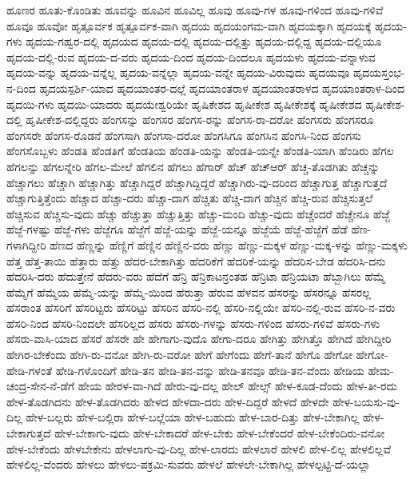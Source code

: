 {ಹೂಣರ
ಹೂತು-ಕೊಂಡಿತು
ಹೂವನ್ನು
ಹೂವಿನ
ಹೂವಿಲ್ಲ
ಹೂವು
ಹೂವು-ಗಳ
ಹೂವು-ಗಳಿಂದ
ಹೂವು-ಗಳಿವೆ
ಹೂವೂ
ಹೂವೋ
ಹೃತ್ಪೂರ್ವಕ
ಹೃತ್ಪೂರ್ವಕ-ವಾಗಿ
ಹೃದಯ
ಹೃದಯಂಗಮ-ವಾಗಿ
ಹೃದಯಕ್ಕಾಗಿ
ಹೃದಯಕ್ಕೆ
ಹೃದಯ-ಗಳು
ಹೃದಯ-ಗಹ್ವರ-ದಲ್ಲಿ
ಹೃದಯದ
ಹೃದಯ-ದಲ್ಲಿ
ಹೃದಯ-ದಲ್ಲಿತ್ತು
ಹೃದಯ-ದಲ್ಲಿದ್ದ
ಹೃದಯ-ದಲ್ಲಿಯೂ
ಹೃದಯ-ದಲ್ಲಿ-ರುವ
ಹೃದಯ-ದ-ವರು
ಹೃದಯ-ದಿಂದ
ಹೃದಯ-ದಿಂದಲೂ
ಹೃದಯಳು
ಹೃದಯ-ವನ್ನಾಳುವ
ಹೃದಯ-ವನ್ನು
ಹೃದಯ-ವನ್ನೆಲ್ಲ
ಹೃದಯ-ವನ್ನೆಲ್ಲಾ
ಹೃದಯ-ವನ್ನೇ
ಹೃದಯ-ವಿರುವುದು
ಹೃದಯವೂ
ಹೃದಯಸ್ತಂಭ-ನ-ದಿಂದ
ಹೃದಯಸ್ಪರ್ಶಿ-ಯಾದ
ಹೃದಯಾಂತರ-ದಲ್ಲೆ
ಹೃದಯಾಂತರಾಳ
ಹೃದಯಾಂತರಾಳದ
ಹೃದಯಾಂತರಾಳ-ದಿಂದ
ಹೃದಯಿ-ಗಳು
ಹೃದಯಿ-ಯಾದರು
ಹೃದಯೇಶ್ವರಿಯೇ
ಹೃಷಿಕೇಶದ
ಹೃಷೀಕೇಶ
ಹೃಷೀಕೇಶಕ್ಕೆ
ಹೃಷೀಕೇಶದ
ಹೃಷೀಕೇಶ-ದಲ್ಲಿ
ಹೃಷೀಕೇಶ-ದಲ್ಲಿದ್ದರು
ಹೆಂಗಸನ್ನು
ಹೆಂಗಸರ
ಹೆಂಗಸ-ರನ್ನು
ಹೆಂಗಸ-ರಾ-ದರೋ
ಹೆಂಗಸರು
ಹೆಂಗಸರೂ
ಹೆಂಗಸರೇ
ಹೆಂಗಸ-ರೊಡನೆ
ಹೆಂಗಸಾಗಿ
ಹೆಂಗಸಾ-ದರೋ
ಹೆಂಗಸಿಗೂ
ಹೆಂಗಸಿನ
ಹೆಂಗಸಿ-ನಿಂದ
ಹೆಂಗಸು
ಹೆಂಗಸೊಬ್ಬಳು
ಹೆಂಡತಿ
ಹೆಂಡತಿಗೆ
ಹೆಂಡತಿಯ
ಹೆಂಡತಿ-ಯನ್ನು
ಹೆಂಡತಿ-ಯನ್ನೇ
ಹೆಂಡತಿ-ಯಾಗಿ
ಹೆಂಡಿರು
ಹೆಗಲ
ಹೆಗಲನ್ನು
ಹೆಗಲನ್ನೇರಿ
ಹೆಗಲ-ಮೇಲೆ
ಹೆಗಲಿನ
ಹೆಗಲು
ಹೆಗಾರ್
ಹೆಚ್
ಹೆಚ್ಆರ್
ಹೆಚ್ಚ-ತೊಡಗಿತು
ಹೆಚ್ಚನ್ನು
ಹೆಚ್ಚಾಗಲು
ಹೆಚ್ಚಾಗಿ
ಹೆಚ್ಚಾಗಿತ್ತು
ಹೆಚ್ಚಾಗಿದ್ದರೆ
ಹೆಚ್ಚಾಗಿದ್ದಿದ್ದರೆ
ಹೆಚ್ಚಾಗಿರು-ವು-ದರಿಂದ
ಹೆಚ್ಚಾಗುತ್ತ
ಹೆಚ್ಚಾಗುತ್ತದೆ
ಹೆಚ್ಚಾಗುತ್ತಿತ್ತೆಂದು
ಹೆಚ್ಚಾದ
ಹೆಚ್ಚಾ-ದರು
ಹೆಚ್ಚಾ-ದಾಗ
ಹೆಚ್ಚಿತು
ಹೆಚ್ಚಿ-ದಾಗ
ಹೆಚ್ಚಿನ
ಹೆಚ್ಚಿ-ರುವ
ಹೆಚ್ಚಿಸುತ್ತಲೆ
ಹೆಚ್ಚಿಸುವ
ಹೆಚ್ಚಿಸು-ವುದು
ಹೆಚ್ಚು
ಹೆಚ್ಚುತ್ತಾ
ಹೆಚ್ಚುತ್ತಿತ್ತು
ಹೆಚ್ಚು-ಮಂದಿ
ಹೆಚ್ಚು-ವುದು
ಹೆಚ್ಚೆಂದರೆ
ಹೆಚ್ಚೇನೂ
ಹೆಜ್ಜೆ
ಹೆಜ್ಜೆ-ಗಳಷ್ಟು
ಹೆಜ್ಜೆ-ಗಳು
ಹೆಜ್ಜೆಗೂ
ಹೆಜ್ಜೆಗೆ
ಹೆಜ್ಜೆ-ಯನ್ನು
ಹೆಜ್ಜೆ-ಯನ್ನೂ
ಹೆಜ್ಜೆಯೆ
ಹೆಜ್ಜೆ-ಹೆಜ್ಜೆಗೆ
ಹೆಡೆ
ಹೆಣ-ಗಳಾಗಿದ್ದೀರಿ
ಹೆಣದ
ಹೆಣ್ಣನ್ನು
ಹೆಣ್ಣಿಗೆ
ಹೆಣ್ಣಿನ
ಹೆಣ್ಣಿನ-ವರು
ಹೆಣ್ಣು
ಹೆಣ್ಣು-ಮಕ್ಕಳ
ಹೆಣ್ಣು-ಮಕ್ಕ-ಳನ್ನು
ಹೆಣ್ಣು-ಮಕ್ಕಳು
ಹೆತ್ತ
ಹೆತ್ತ-ತಾಯಿ
ಹೆತ್ತಾರು
ಹೆತ್ತು
ಹೆದರ-ಬೇಕಾಗಿತ್ತು
ಹೆದರಿಕೆಗೆ
ಹೆದರಿಕೆ-ಯನ್ನು
ಹೆದರಿಸ-ಬೇಡ
ಹೆದರಿಸಿ-ದನು
ಹೆದರಿಸಿ-ದರು
ಹೆದುತ್ತೇನೆ
ಹೆದರು-ವರು
ಹೆದೆಗೆ
ಹೆನ್ರಿ
ಹೆನ್ರಿಕಾಟನ್ರಂತಹ
ಹೆನ್ರಿಟಾ
ಹೆನ್ರಿಯಟಾ
ಹೆಬ್ಬಾಗಿಲು
ಹೆಮ್ಮೆ
ಹೆಮ್ಮೆಗೆ
ಹೆಮ್ಮೆಯ
ಹೆಮ್ಮೆ-ಯನ್ನು
ಹೆಮ್ಮೆ-ಯಿಂದ
ಹೆರುತ್ತಾ
ಹೆರುವ
ಹೆಳವನ
ಹೆಸರನ್ನು
ಹೆಸರನ್ನೂ
ಹೆಸರಲ್ಲ
ಹೆಸರಾಂತ
ಹೆಸರಿಗೆ
ಹೆಸರಿಟ್ಟರು
ಹೆಸರಿಟ್ಟು
ಹೆಸರಿನ
ಹೆಸರಿ-ನಲ್ಲಿ
ಹೆಸರಿ-ನಲ್ಲಿಯೇ
ಹೆಸರಿ-ನಲ್ಲಿ-ರುವ
ಹೆಸರಿ-ನ-ವರು
ಹೆಸರಿ-ನಿಂದ
ಹೆಸರಿ-ನಿಂದಲೇ
ಹೆಸರಿಲ್ಲದ
ಹೆಸರು
ಹೆಸರು-ಗಳನ್ನು
ಹೆಸರು-ಗಳಿಂದ
ಹೆಸರು-ಗಳಿವೆ
ಹೆಸರು-ಗಳು
ಹೆಸರು-ವಾಸಿ-ಯಾದ
ಹೆಸರೆ
ಹೆಸರೇ
ಹೇ
ಹೇಗಾಗು-ವುದೊ
ಹೇಗಾ-ದರೂ
ಹೇಗಿತ್ತು
ಹೇಗಿತ್ತೊ
ಹೇಗಿದೆ
ಹೇಗಿದ್ದೀರಿ
ಹೇಗಿರ-ಬೇಕೆಂದು
ಹೇಗಿ-ರು-ವನೋ
ಹೇಗಿ-ರು-ವರೋ
ಹೇಗೆ
ಹೇಗೆಂದು
ಹೇಗೆ-ತಾನೆ
ಹೇಗೊ
ಹೇಗೋ
ಹೇಗೋ-
ಹೇಡಿ-ಗಳಂತೆ
ಹೇಡಿ-ಗಳೊಂದಿಗೆ
ಹೇಡಿ-ತನ
ಹೇಡಿ-ತನ-ವನ್ನು
ಹೇಡಿ-ತನವೂ
ಹೇಡಿ-ತನ-ವೆಂದು
ಹೇಡಿಯ
ಹೇಮ-ಚಂದ್ರ-ಸೇನ-ನೆ-ಡೆಗೆ
ಹೇಯ
ಹೇರಳ-ವಾ-ಗಿದೆ
ಹೇರು-ವು-ದಲ್ಲ
ಹೇಲ್
ಹೇಲ್ಸ್
ಹೇಳ-ಕೂಡ-ದೆಂದು
ಹೇಳ-ತೀ-ರದು
ಹೇಳ-ತೊಡಗಿದನು
ಹೇಳ-ತೊಡಗಿದರು
ಹೇಳದ
ಹೇಳದಾ-ದರು
ಹೇಳ-ದಿದ್ದರೆ
ಹೇಳದೆ
ಹೇಳದೇ
ಹೇಳ-ಬಯಸು-ವು-ದಿಲ್ಲ
ಹೇಳ-ಬಲ್ಲರು
ಹೇಳ-ಬಲ್ಲಿರಾ
ಹೇಳ-ಬಲ್ಲೆಯಾ
ಹೇಳ-ಬಹುದು
ಹೇಳ-ಬಾರ-ದಿತ್ತು
ಹೇಳ-ಬೇಕಾಗಿಲ್ಲ
ಹೇಳ-ಬೇಕಾಗುತ್ತದೆ
ಹೇಳ-ಬೇಕಾಗು-ವುದು
ಹೇಳ-ಬೇಕಾದರೆ
ಹೇಳ-ಬೇಕು
ಹೇಳ-ಬೇಕೆಂದರೆ
ಹೇಳ-ಬೇಕೆಂದಿರು-ವನೋ
ಹೇಳ-ಬೇಕೆಂದು
ಹೇಳಬೇಕೇನು
ಹೇಳಲಾಗು-ವು-ದಿಲ್ಲ
ಹೇಳ-ಲಾರದು
ಹೇಳಲಾರೆ
ಹೇಳಲಿ
ಹೇಳ-ಲಿಲ್ಲ
ಹೇಳಲಿಲ್ಲವೆ
ಹೇಳಲಿಲ್ಲ-ವೆಂದರು
ಹೇಳಲು
ಹೇಳಲು-ಪಕ್ರಮಿ-ಸುವರು
ಹೇಳಲೆ
ಹೇಳಲೇ-ಬೇಕಾಗಿಲ್ಲ
ಹೇಳಲ್ಪಟ್ಟಿ-ದೆ-ಯಲ್ಲಾ
}
